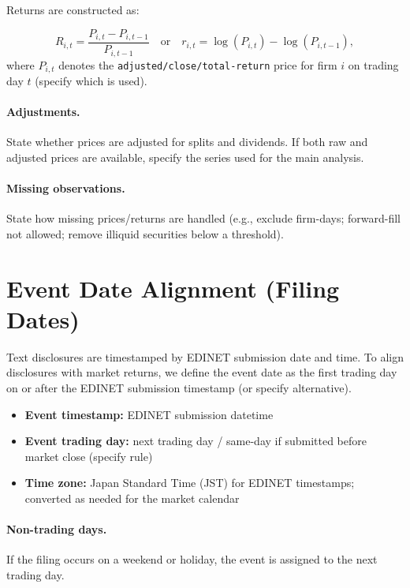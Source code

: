 Returns are constructed as:

\[
R_{i,t} = \frac{P_{i,t} - P_{i,t-1}}{P_{i,t-1}}
\quad \text{or} \quad
r_{i,t} = \log(P_{i,t}) - \log(P_{i,t-1}),
\]
where $P_{i,t}$ denotes the \texttt{adjusted/close/total-return} price for firm $i$ on trading day $t$ (specify which is used).

\paragraph{Adjustments.}
State whether prices are adjusted for splits and dividends. If both raw and adjusted prices are available, specify the series used for the main analysis.

\paragraph{Missing observations.}
State how missing prices/returns are handled (e.g., exclude firm-days; forward-fill not allowed; remove illiquid securities below a threshold).

\section{Event Date Alignment (Filing Dates)}
\label{appendix:event_alignment}

Text disclosures are timestamped by EDINET submission date and time. To align disclosures with market returns, we define the event date as the first trading day on or after the EDINET submission timestamp (or specify alternative).

\begin{itemize}
  \item \textbf{Event timestamp:} EDINET submission datetime
  \item \textbf{Event trading day:} next trading day / same-day if submitted before market close (specify rule)
  \item \textbf{Time zone:} Japan Standard Time (JST) for EDINET timestamps; converted as needed for the market calendar
\end{itemize}

\paragraph{Non-trading days.}
If the filing occurs on a weekend or holiday, the event is assigned to the next trading day.

